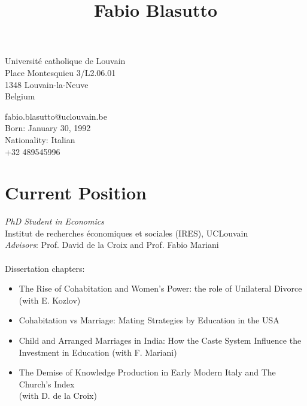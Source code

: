 \documentclass[10pt]{article} %
\begin{document}
\begin{center}
\title{Fabio Blasutto} %
\end{center}

\pagestyle{empty}
\parbox{0.5\textwidth}{ %
 Université catholique de Louvain\\ %
 Place Montesquieu 3/L2.06.01\\ %
 1348 Louvain-la-Neuve\\ %
 Belgium %
}
\hfill %
\parbox[left]{0.5\textwidth}{\raggedleft 

fabio.blasutto@uclouvain.be \\ %
Born: January 30, 1992 \\
Nationality: Italian \\
+32 489545996  
}
\vspace{0.4cm}
\section{Current Position}
\textit{PhD Student in Economics}\\
Institut de recherches économiques et sociales (IRES), UCLouvain \\
\textit{Advisors}: Prof. David de la Croix and Prof. Fabio Mariani\\
\vspace{0.2cm}\\
Dissertation chapters: 
\begin{itemize}
\item The Rise of Cohabitation and Women's Power: the role of Unilateral Divorce\\
(with E. Kozlov)
\item Cohabitation vs Marriage: Mating Strategies by Education in the USA
\item Child and Arranged Marriages in India: How the Caste System Influence the Investment in Education
(with F. Mariani)
\item The Demise of Knowledge Production in Early Modern Italy and The Church's Index\\
(with D. de la Croix)
\end{itemize}
\end{document}
